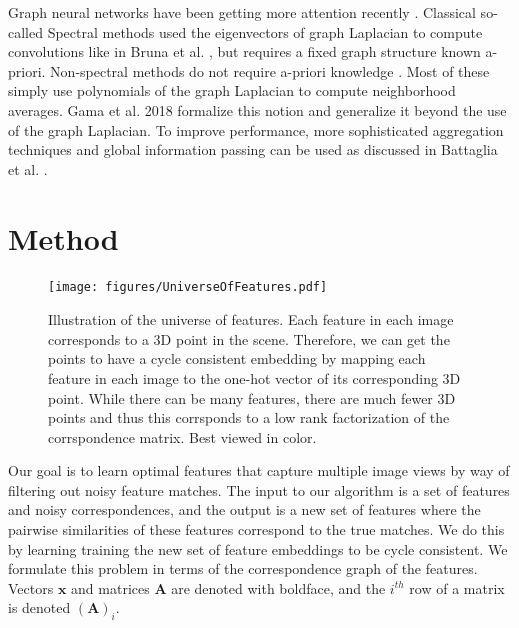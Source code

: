 \documentclass[10pt,twocolumn,letterpaper]{article}
\newcommand{\mat}[1]{\mathbf{#1}}
\begin{document}
Graph neural networks have been getting more attention recently \cite{bronstein2017geometric, bruna2013spectral, defferrard2016convolutional, kipf2016semi, scarselli2009graph, gama2018mimo, gama2018convolutional, battaglia2018relational}.
Classical so-called Spectral methods used the eigenvectors of graph Laplacian to compute convolutions like in Bruna et al. \cite{bruna2013spectral}, but requires a fixed graph structure known a-priori. 
Non-spectral methods do not require a-priori knowledge \cite{bronstein2017geometric, kipf2016semi, scarselli2009graph, gama2018convolutional}.
Most of these simply use polynomials of the graph Laplacian to compute neighborhood averages. Gama et al. 2018 \cite{gama2018mimo, gama2018convolutional} formalize this notion and generalize it beyond the use of the graph Laplacian.
To improve performance, more sophisticated aggregation techniques and global information passing can be used as discussed in Battaglia et al. \cite{battaglia2018relational}.

\section{Method}

\begin{figure}[t]
\begin{center}
  \texttt{[image: figures/UniverseOfFeatures.pdf]}
\end{center}
  \caption{
    Illustration of the universe of features.
    Each feature in each image corresponds to a 3D point in the scene.
    Therefore, we can get the points to have a cycle consistent embedding by mapping each feature in each image to the one-hot vector of its corresponding 3D point.
    While there can be many features, there are much fewer 3D points and thus this corrsponds to a low rank factorization of the corrspondence matrix.
    Best viewed in color.
  }
\label{fig:universefeatures}
\label{fig:onecol}
\end{figure}
Our goal is to learn optimal features that capture multiple image views by way of filtering out noisy feature matches.
The input to our algorithm is a set of features and noisy correspondences, and the output is a new set of features where the pairwise similarities of these features correspond to the true matches.
We do this by learning training the new set of feature embeddings to be cycle consistent.
We formulate this problem in terms of the correspondence graph of the features.
Vectors $\mat{x}$ and matrices $\mat{A}$ are denoted with boldface, and the $i^{th}$ row of a matrix is denoted $(\mat{A})_i$.
\end{document}
